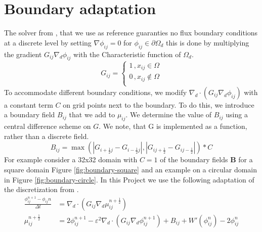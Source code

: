 \documentclass{mimosis}
\begin{document}
\chapter{Boundary adaptation}
\label{sec:orgc927f71}
The solver from \autocite{SHIN20117441}, that we use as reference guaranties no flux boundary conditions at a discrete level by setting \(\nabla \phi_{ij} = 0\) for \(\phi_{ij} \in \partial \Omega_{d}\) this is done by multiplying the gradient \(G_{ij} \nabla_d \phi_{ij}\) with the Characteristic function of \(\Omega_{d}\).
\begin{equation}
G_{ij}=
\begin{cases}
1 \,, x_{ij} \in \Omega \\
0 \,, x_{ij} \not\in \Omega \\
\end{cases}
\end{equation}
To accommodate different boundary conditions, we modify \(\nabla_d \cdot (G_{ij} \nabla_d \phi_{ij})\) with a constant term \(C\) on grid points next to the boundary. To do this, we introduce a boundary field \(B_{ij}\) that we add to \(\mu_{ij}\). We determine the value of \(B_{ij}\) using a central difference scheme on \(G\). We note, that G is implemented as a function, rather than a discrete field.
\begin{equation}
B_{ij} = \max\left(  |G_{i+\frac{1}{2}j} - G_{i-\frac{1}{2}j}| , |G_{ij+\frac{1}{2}} - G_{ij-\frac{1}{2}}|\right) * C
\end{equation}
For example consider a 32x32 domain with \(C=1\) of the boundary fields \(\mathbf{B}\) for a square domain Figure \ref{fig:boundary-square} and an example on a circular domain in Figure \ref{fig:boundary-circle}.
In this Project we use the following adaptation of the discretization from \autocite{SHIN20117441}.
\begin{equation}
\label{eq:second-order-adapted-ansatz}
\begin{aligned}
\frac{\phi_{ij}^{n+1} - \phi_{ij}n}{\Delta t}  &=  \nabla _d \cdot (G_{ij} \nabla_d \mu_{ij}^{n+\frac{1}{2}} )  \\
 \mu_{ij}^{n+\frac{1}{2}} &= 2\phi_{ij}^{n+1} - \varepsilon^2  \nabla_d \cdot  (G_{ij} \nabla _d \phi_{ij}^{n+1} ) + B_{ij} + W'(\phi_{ij}^n) - 2\phi _{ij}^n
\end{aligned}
\end{equation}
\end{document}
